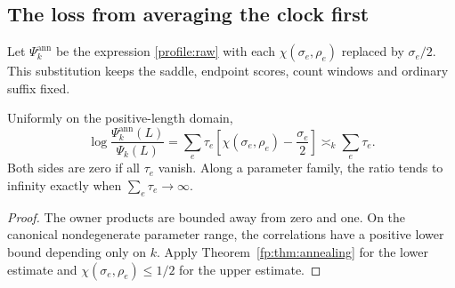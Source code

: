 \subsection{The loss from averaging the clock first}
Let $\Psi_k^{\mathrm{ann}}$ be the expression \eqref{profile:raw}
with each $\chi(\sigma_e,\rho_e)$ replaced by $\sigma_e/2$.
This substitution keeps the saddle, endpoint scores, count windows
and ordinary suffix fixed.
\begin{corollary}\label{fp:cor:anneal-profile}
Uniformly on the positive-length domain,
\begin{equation}\label{fp:eq:anneal-profile}
 \log\frac{\Psi_k^{\mathrm{ann}}(L)}{\Psi_k(L)}
 =\sum_e\tau_e\left[\chi(\sigma_e,\rho_e)-\frac{\sigma_e}{2}\right]
 \asymp_k\sum_e\tau_e.
\end{equation}
Both sides are zero if all $\tau_e$ vanish. Along a parameter family,
the ratio tends to infinity exactly when $\sum_e\tau_e\to\infty$.
\end{corollary}
\begin{proof}
The owner products are bounded away from zero and one. On the
canonical nondegenerate parameter range, the correlations have a
positive lower bound depending only on $k$. Apply
Theorem~\ref{fp:thm:annealing} for the lower estimate and
$\chi(\sigma_e,\rho_e)\le1/2$ for the upper estimate.
\end{proof}

